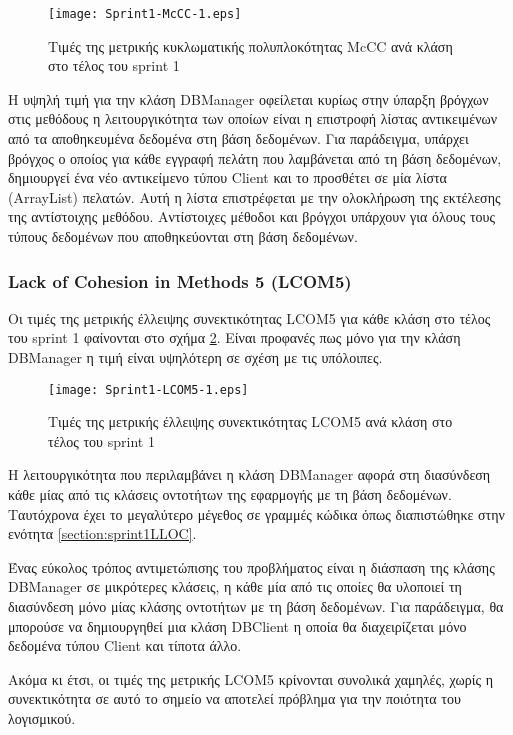 \begin{figure}
\centering
\texttt{[image: Sprint1-McCC-1.eps]}
\caption{Τιμές της μετρικής κυκλωματικής πολυπλοκότητας McCC ανά κλάση στο τέλος του sprint 1}
\label{fig:sprint1McCC}
\end{figure}

H υψηλή τιμή για την κλάση DBManager οφείλεται κυρίως στην
ύπαρξη βρόγχων στις μεθόδους η λειτουργικότητα των οποίων είναι η
επιστροφή λίστας αντικειμένων από τα αποθηκευμένα δεδομένα στη βάση
δεδομένων. Για παράδειγμα, υπάρχει βρόγχος ο οποίος για κάθε εγγραφή
πελάτη που λαμβάνεται από τη βάση δεδομένων, δημιουργεί ένα νέο
αντικείμενο τύπου Client και το προσθέτει σε μία λίστα (ArrayList)
πελατών. Αυτή η λίστα επιστρέφεται με την ολοκλήρωση της εκτέλεσης της
αντίστοιχης μεθόδου. Αντίστοιχες μέθοδοι και βρόγχοι υπάρχουν για όλους
τους τύπους δεδομένων που αποθηκεύονται στη βάση δεδομένων.

\subsubsection{Lack of Cohesion in Methods 5 (LCOM5)}
\label{section:sprint1LCOM5}

Οι τιμές της μετρικής έλλειψης συνεκτικότητας LCOM5 για κάθε κλάση στο
τέλος του sprint 1 φαίνονται στο σχήμα \ref{fig:sprint1LCOM5}. Είναι
προφανές πως μόνο για την κλάση DBManager η τιμή είναι υψηλότερη σε
σχέση με τις υπόλοιπες.

\begin{figure}
\centering
\texttt{[image: Sprint1-LCOM5-1.eps]}
\caption{Τιμές της μετρικής έλλειψης συνεκτικότητας LCOM5 ανά κλάση στο τέλος του sprint 1}
\label{fig:sprint1LCOM5}
\end{figure}

Η λειτουργικότητα που περιλαμβάνει η κλάση DBManager αφορά στη
διασύνδεση κάθε μίας από τις κλάσεις οντοτήτων της εφαρμογής με τη βάση
δεδομένων. Ταυτόχρονα έχει το μεγαλύτερο μέγεθος
σε γραμμές κώδικα όπως διαπιστώθηκε στην ενότητα
\ref{section:sprint1LLOC}.

Ένας εύκολος τρόπος αντιμετώπισης του προβλήματος είναι η διάσπαση της
κλάσης DBManager σε μικρότερες κλάσεις, η κάθε μία από τις οποίες
θα υλοποιεί τη διασύνδεση μόνο μίας κλάσης οντοτήτων με τη βάση
δεδομένων. Για παράδειγμα, θα μπορούσε να δημιουργηθεί μια κλάση
DBClient η οποία θα διαχειρίζεται μόνο δεδομένα τύπου Client και τίποτα
άλλο.

Ακόμα κι έτσι, οι τιμές της μετρικής LCOM5 κρίνονται συνολικά χαμηλές,
χωρίς η συνεκτικότητα σε αυτό το σημείο να αποτελεί πρόβλημα για την
ποιότητα του λογισμικού.

